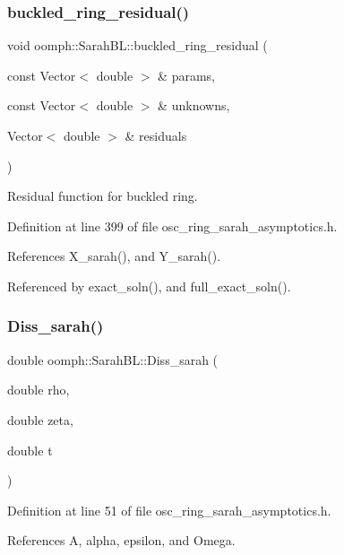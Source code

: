 \subsubsection{\texorpdfstring{buckled\+\_\+ring\+\_\+residual()}{buckled\_ring\_residual()}}
{\footnotesize\ttfamily void oomph\+::\+Sarah\+B\+L\+::buckled\+\_\+ring\+\_\+residual (\begin{DoxyParamCaption}\item[{const Vector$<$ double $>$ \&}]{params,  }\item[{const Vector$<$ double $>$ \&}]{unknowns,  }\item[{Vector$<$ double $>$ \&}]{residuals }\end{DoxyParamCaption})}



Residual function for buckled ring. 



Definition at line 399 of file osc\+\_\+ring\+\_\+sarah\+\_\+asymptotics.\+h.



References X\+\_\+sarah(), and Y\+\_\+sarah().



Referenced by exact\+\_\+soln(), and full\+\_\+exact\+\_\+soln().

\mbox{\label{namespaceoomph_1_1SarahBL_a38ddc42a9eb5dee8b355795e28df0e45}} 
\subsubsection{\texorpdfstring{Diss\+\_\+sarah()}{Diss\_sarah()}}
{\footnotesize\ttfamily double oomph\+::\+Sarah\+B\+L\+::\+Diss\+\_\+sarah (\begin{DoxyParamCaption}\item[{double}]{rho,  }\item[{double}]{zeta,  }\item[{double}]{t }\end{DoxyParamCaption})}



Definition at line 51 of file osc\+\_\+ring\+\_\+sarah\+\_\+asymptotics.\+h.



References A, alpha, epsilon, and Omega.



